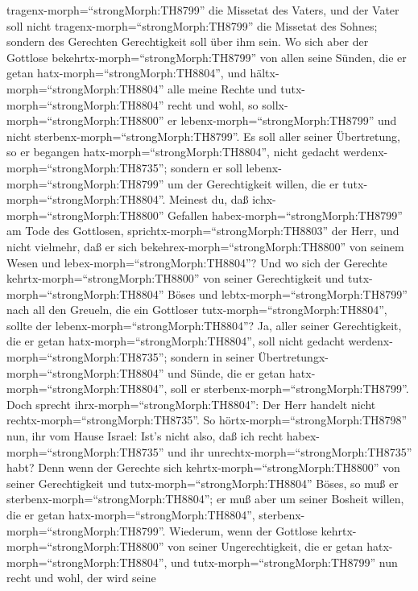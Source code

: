 tragenx-morph=``strongMorph:TH8799'' die Missetat des Vaters, und der
Vater soll nicht tragenx-morph=``strongMorph:TH8799'' die Missetat des
Sohnes; sondern des Gerechten Gerechtigkeit soll über ihm sein.
 Wo sich aber der Gottlose
bekehrtx-morph=``strongMorph:TH8799'' von allen seine Sünden, die er
getan hatx-morph=``strongMorph:TH8804'', und
hältx-morph=``strongMorph:TH8804'' alle meine Rechte und
tutx-morph=``strongMorph:TH8804'' recht und wohl, so
sollx-morph=``strongMorph:TH8800'' er
lebenx-morph=``strongMorph:TH8799'' und nicht
sterbenx-morph=``strongMorph:TH8799''.  Es soll aller
seiner Übertretung, so er begangen hatx-morph=``strongMorph:TH8804'',
nicht gedacht werdenx-morph=``strongMorph:TH8735''; sondern er soll
lebenx-morph=``strongMorph:TH8799'' um der Gerechtigkeit willen, die er
tutx-morph=``strongMorph:TH8804''.  Meinest du, daß
ichx-morph=``strongMorph:TH8800'' Gefallen
habex-morph=``strongMorph:TH8799'' am Tode des Gottlosen,
sprichtx-morph=``strongMorph:TH8803'' der Herr, und nicht vielmehr, daß
er sich bekehrex-morph=``strongMorph:TH8800'' von seinem Wesen und
lebex-morph=``strongMorph:TH8804''?  Und wo sich der
Gerechte kehrtx-morph=``strongMorph:TH8800'' von seiner Gerechtigkeit
und tutx-morph=``strongMorph:TH8804'' Böses und
lebtx-morph=``strongMorph:TH8799'' nach all den Greueln, die ein
Gottloser tutx-morph=``strongMorph:TH8804'', sollte der
lebenx-morph=``strongMorph:TH8804''? Ja, aller seiner Gerechtigkeit, die
er getan hatx-morph=``strongMorph:TH8804'', soll nicht gedacht
werdenx-morph=``strongMorph:TH8735''; sondern in seiner
Übertretungx-morph=``strongMorph:TH8804'' und Sünde, die er getan
hatx-morph=``strongMorph:TH8804'', soll er
sterbenx-morph=``strongMorph:TH8799''.  Doch sprecht
ihrx-morph=``strongMorph:TH8804'': Der Herr handelt nicht
rechtx-morph=``strongMorph:TH8735''. So
hörtx-morph=``strongMorph:TH8798'' nun, ihr vom Hause Israel: Ist's
nicht also, daß ich recht habex-morph=``strongMorph:TH8735'' und ihr
unrechtx-morph=``strongMorph:TH8735'' habt?  Denn wenn der
Gerechte sich kehrtx-morph=``strongMorph:TH8800'' von seiner
Gerechtigkeit und tutx-morph=``strongMorph:TH8804'' Böses, so muß er
sterbenx-morph=``strongMorph:TH8804''; er muß aber um seiner Bosheit
willen, die er getan hatx-morph=``strongMorph:TH8804'',
sterbenx-morph=``strongMorph:TH8799''.  Wiederum, wenn der
Gottlose kehrtx-morph=``strongMorph:TH8800'' von seiner Ungerechtigkeit,
die er getan hatx-morph=``strongMorph:TH8804'', und
tutx-morph=``strongMorph:TH8799'' nun recht und wohl, der wird seine
